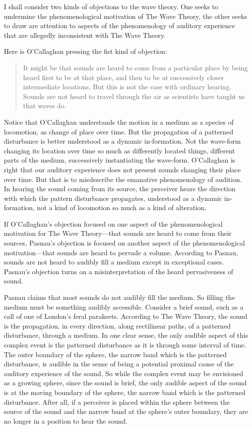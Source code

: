 \documentclass[12pt]{article}
\begin{document}
I shall consider two kinds of objections to the wave theory. One seeks to undermine the phenomenological motivation of The Wave Theory, the other seeks to draw are attention to aspects of the phenomenology of auditory experience that are allegedly inconsistent with The Wave Theory.

Here is O’Callaghan pressing the fist kind of objection:
\begin{quote}
	It might be that sounds are heard to come from a particular place by being heard first to be at that place, and then to be at successively closer intermediate locations. But this is not the case with ordinary hearing. Sounds are not heard to travel through the air as scientists have taught us that waves do. \citep[34]{OCallaghan:2007xy}
\end{quote}
Notice that O’Callaghan understands the motion in a medium as a species of locomotion, as change of place over time. But the propagation of a patterned disturbance is better understood as a dynamic in-formation. Not the wave-form changing its location over time so much as differently located things, different parts of the medium, successively instantiating the wave-form. O'Callaghan is right that our auditory experience does not present sounds changing their place over time. But that is to misdescribe the emanative phenomenology of audition. In hearing the sound coming from its source, the perceiver hears the direction with which the pattern disturbance propagates, understood as a dynamic in-formation, not a kind of locomotion so much as a kind of alteration.

If O’Callaghan’s objection focused on one aspect of the phenomenological motivation for The Wave Theory---that sounds are heard to come from their sources, Pasnau’s objection is focused on another aspect of the phenomenological motivation---that sounds are heard to pervade a volume. According to Pasnau, sounds are not heard to audibly fill a medium except in exceptional cases. Pasnau's objection turns on a misinterpretation of the heard pervasiveness of sound.

Pasnau claims that most sounds do not audibly fill the medium. So filling the medium must be something audibly accessible. Consider a brief sound, such as a call of one of London's feral parakeets. According to The Wave Theory, the sound is the propagation, in every direction, along rectilinear paths, of a patterned disturbance, through a medium. In one clear sense, the only audible aspect of this complex event is the patterned disturbance as it is through some interval of time. The outer boundary of the sphere, the narrow band which is the patterned disturbance, is audible in the sense of being a potential proximal cause of the auditory experience of the sound. So while the complex event may be envisioned as a growing sphere, since the sound is brief, the only audible aspect of the sound is at the moving boundary of the sphere, the narrow band which is the patterned disturbance. After all, if a perceiver is placed within the sphere between the source of the sound and the narrow band at the sphere's outer boundary, they are no longer in a position to hear the sound. 
\end{document}
